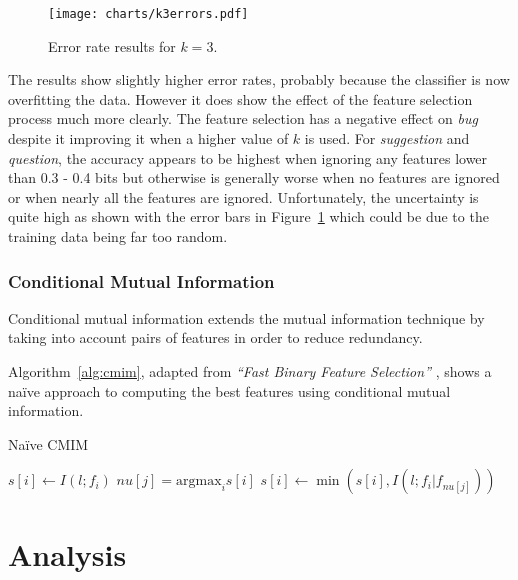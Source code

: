 \begin{figure}[h]
	\centering
	\texttt{[image: charts/k3errors.pdf]}
	\label{fig:mi_errors_k3}
	\caption{Error rate results for $k = 3$.}
\end{figure}

The results show slightly higher error rates, probably because the classifier is now overfitting the data. However it does show
the effect of the feature selection process much more clearly. The feature selection has a negative effect on \textit{bug}
despite it improving it when a higher value of $k$ is used. For \textit{suggestion} and \textit{question}, the accuracy appears
to be highest when ignoring any features lower than 0.3 - 0.4 bits but otherwise is generally worse when no features are ignored
or when nearly all the features are ignored. Unfortunately, the uncertainty is quite high as shown with the error bars in
Figure~\ref{fig:mi_errors_k3} which could be due to the training data being far too random.

\subsubsection{Conditional Mutual Information}
Conditional mutual information extends the mutual information technique by taking into account pairs of features in order to
reduce redundancy.

Algorithm~\ref{alg:cmim}, adapted from \emph{``Fast Binary Feature Selection''} \cite{fast_binary_feature_selection}, shows a
na\"{i}ve approach to computing the best features using conditional mutual information.

\begin{algorithm}
	\label{alg:cmim}
	\caption{Na\"{i}ve CMIM}
	\begin{algorithmic}
			\STATE $s[i] \gets I(l;f_i)$
		\ENDFOR
			\STATE $nu[j] = \mathrm{argmax}_i s[i]$
				\STATE $s[i] \gets \min(s[i], I(l;f_i | f_{nu[j]}))$
			\ENDFOR
		\ENDFOR
	\end{algorithmic}
\end{algorithm}

\todo{}

\section{Analysis}
\todo{}
\cite{stability_feature_ranking}
\cite{redundant_feature_elimination}

